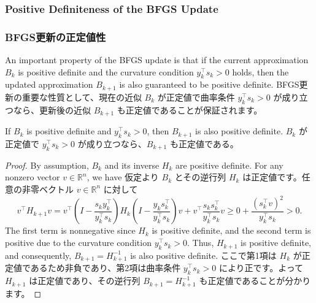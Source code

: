 \documentclass[0_main]{subfiles}
\begin{document}
\ifEn
    \subsubsection{Positive Definiteness of the BFGS Update}
\else
    \subsubsection{BFGS更新の正定値性}
\fi

\ifEn
    An important property of the BFGS update is that if the current approximation $B_k$ is positive definite and the curvature condition $y_k^\top s_k > 0$ holds, then the updated approximation $B_{k+1}$ is also guaranteed to be positive definite.
\else
    BFGS更新の重要な性質として、現在の近似 $B_k$ が正定値で曲率条件 $y_k^\top s_k > 0$ が成り立つなら、更新後の近似 $B_{k+1}$ も正定値であることが保証されます。
\fi

\begin{proposition}
    \ifEn
        If $B_k$ is positive definite and $y_k^\top s_k > 0$, then $B_{k+1}$ is also positive definite.
    \else
        $B_k$ が正定値で $y_k^\top s_k > 0$ が成り立つなら、$B_{k+1}$ も正定値である。
    \fi
\end{proposition}
\begin{proof}
    \ifEn
        By assumption, $B_k$ and its inverse $H_k$ are positive definite. For any nonzero vector $v \in \mathbb{R}^n$, we have
    \else
        仮定より $B_k$ とその逆行列 $H_k$ は正定値です。任意の非零ベクトル $v \in \mathbb{R}^n$ に対して
    \fi
    \begin{equation*}
        v^\top H_{k+1} v
        = v^\top \left(I - \frac{s_k y_k^\top}{y_k^\top s_k}\right) H_k \left(I - \frac{y_k s_k^\top}{y_k^\top s_k}\right) v + v^\top \frac{s_k s_k^\top}{y_k^\top s_k} v
        \geq 0 + \frac{(s_k^\top v)^2}{y_k^\top s_k} > 0.
    \end{equation*}
    \ifEn
        The first term is nonnegative since $H_k$ is positive definite, and the second term is positive due to the curvature condition $y_k^\top s_k > 0$. Thus, $H_{k+1}$ is positive definite, and consequently, $B_{k+1} = H_{k+1}^{-1}$ is also positive definite.
    \else
        ここで第1項は $H_k$ が正定値であるため非負であり、第2項は曲率条件 $y_k^\top s_k > 0$ により正です。よって $H_{k+1}$ は正定値であり、その逆行列 $B_{k+1} = H_{k+1}^{-1}$ も正定値であることが分かります。
    \fi
    \myQED
\end{proof}
\end{document}
